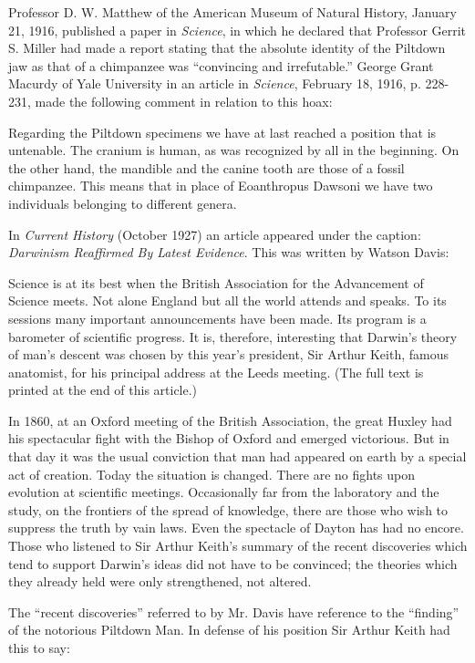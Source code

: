 Professor D. W. Matthew of the American Museum of Natural History, January 21, 1916,
published a paper in \textit{Science}, in which he declared that Professor Gerrit S. Miller had made a
report stating that the absolute identity of the Piltdown jaw as that of a chimpanzee was
``convincing and irrefutable.'' George Grant Macurdy of Yale University in an article in
\textit{Science}, February 18, 1916, p. 228-231, made the following comment in relation to this
hoax:

Regarding the Piltdown specimens we have at last reached a position that is untenable. The
cranium is human, as was recognized by all in the beginning. On the other hand, the
mandible and the canine tooth are those of a fossil chimpanzee. This means that in place of
Eoanthropus Dawsoni we have two individuals belonging to different genera.

In \textit{Current History} (October 1927) an article appeared under the caption: \textit{Darwinism
Reaffirmed By Latest Evidence}. This was written by Watson Davis:

Science is at its best when the British Association for the Advancement of Science meets.
Not alone England but all the world attends and speaks. To its sessions many important
announcements have been made. Its program is a barometer of scientific progress. It is,
therefore, interesting that Darwin's theory of man's descent was chosen by this year's
president, Sir Arthur Keith, famous anatomist, for his principal address at the Leeds meeting.
(The full text is printed at the end of this article.)

In 1860, at an Oxford meeting of the British Association, the great Huxley had his
spectacular fight with the Bishop of Oxford and emerged victorious. But in that day it was
the usual conviction that man had appeared on earth by a special act of creation. Today the
situation is changed. There are no fights upon evolution at scientific meetings. Occasionally
far from the laboratory and the study, on the frontiers of the spread of knowledge, there are
those who wish to suppress the truth by vain laws. Even the spectacle of Dayton has had no
encore. Those who listened to Sir Arthur Keith's summary of the recent discoveries which
tend to support Darwin's ideas did not have to be convinced; the theories which they already
held were only strengthened, not altered.

The ``recent discoveries'' referred to by Mr. Davis have reference to the ``finding'' of the
notorious Piltdown Man. In defense of his position Sir Arthur Keith had this to say:

